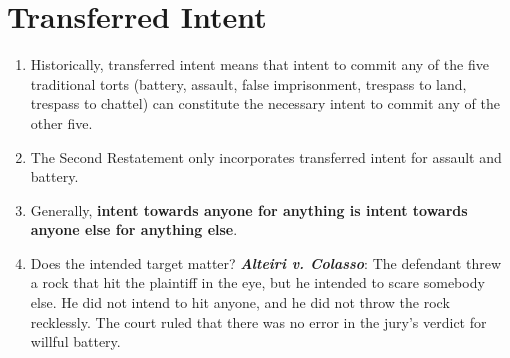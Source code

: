 \section{Transferred Intent}

\begin{enumerate}
    \item Historically, transferred intent means that intent to commit any of the five traditional torts (battery, assault, false imprisonment, trespass to land, trespass to chattel) can constitute the necessary intent to commit any of the other five. 
    \item The Second Restatement only incorporates transferred intent for assault and battery.
    \item Generally, \textbf{intent towards anyone for anything is intent towards anyone else for anything else}.
    \item Does the intended target matter? \textbf{\emph{Alteiri v. Colasso}}:  The defendant threw a rock that hit the plaintiff in the eye, but he intended to scare somebody else. He did not intend to hit anyone, and he did not throw the rock recklessly. The court ruled that there was no error in the jury's verdict for willful battery.
\end{enumerate}
